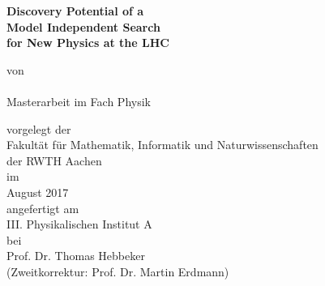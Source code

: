 
\makeatletter
\begin{titlepage}
		\tgherosfont
		\centering
		
		\Large
		
		\vspace*{\fill}
		
		{
            \color{ctcolormain}
            \fontsize{30}{32}\selectfont
            \bfseries
            Discovery Potential of a \\
            Model Independent Search \\
            for New Physics at the LHC
            \par
		}
		
		\vspace{24mm}
		
		\textsf{von} \\
		{\LARGE \@author} \\[32mm]
		
		Masterarbeit im Fach Physik \\[8mm]
		
		\large
		
		\textsf{vorgelegt der} \\
		Fakultät für Mathematik, Informatik und Naturwissenschaften \\der RWTH Aachen \\[8mm]
		
		\textsf{im} \\
		August 2017 \\[8mm]
		
		\textsf{angefertigt am} \\
		III. Physikalischen Institut A \\[8mm]
		
		\textsf{bei} \\
		Prof. Dr. Thomas Hebbeker \\
        (Zweitkorrektur: Prof. Dr. Martin Erdmann)
\end{titlepage}
\makeatother